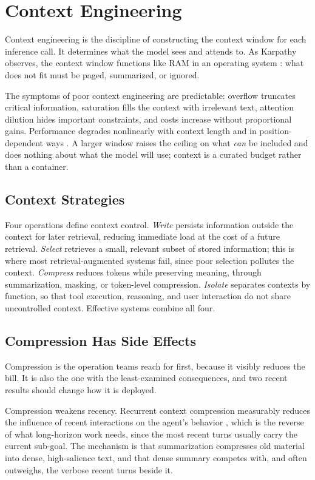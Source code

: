 \documentclass[11pt]{book}
\begin{document}
\section{Context Engineering}

Context engineering is the discipline of constructing the context window for each inference call. It determines what the model sees and attends to. As Karpathy observes, the context window functions like RAM in an operating system \cite{langchain2025context}: what does not fit must be paged, summarized, or ignored.

The symptoms of poor context engineering are predictable: overflow truncates critical information, saturation fills the context with irrelevant text, attention dilution hides important constraints, and costs increase without proportional gains. Performance degrades nonlinearly with context length and in position-dependent ways \cite{liu2024lost}. A larger window raises the ceiling on what \textit{can} be included and does nothing about what the model will use; context is a curated budget rather than a container.

\subsection{Context Strategies}

Four operations define context control. \textit{Write} persists information outside the context for later retrieval, reducing immediate load at the cost of a future retrieval. \textit{Select} retrieves a small, relevant subset of stored information; this is where most retrieval-augmented systems fail, since poor selection pollutes the context. \textit{Compress} reduces tokens while preserving meaning, through summarization, masking, or token-level compression. \textit{Isolate} separates contexts by function, so that tool execution, reasoning, and user interaction do not share uncontrolled context. Effective systems combine all four.

\subsection{Compression Has Side Effects}

Compression is the operation teams reach for first, because it visibly reduces the bill. It is also the one with the least-examined consequences, and two recent results should change how it is deployed.

Compression weakens recency. Recurrent context compression measurably reduces the influence of recent interactions on the agent's behavior \cite{compressreliab2026}, which is the reverse of what long-horizon work needs, since the most recent turns usually carry the current sub-goal. The mechanism is that summarization compresses old material into dense, high-salience text, and that dense summary competes with, and often outweighs, the verbose recent turns beside it.
\end{document}
